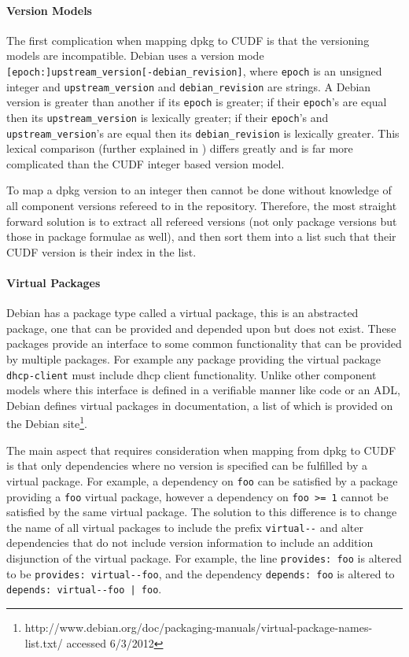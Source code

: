 \paragraph{Version Models}
The first complication when mapping dpkg to CUDF is that the versioning models are incompatible.
Debian uses a version mode \verb+[epoch:]upstream_version[-debian_revision]+,
where \verb+epoch+ is an unsigned integer and \verb+upstream_version+ and \verb+debian_revision+ are strings.
A Debian version is greater than another if its \verb+epoch+ is greater; 
if their \verb+epoch+'s are equal then its \verb+upstream_version+ is lexically greater; 
if their \verb+epoch+'s and \verb+upstream_version+'s are equal then its \verb+debian_revision+ is lexically greater.
This lexical comparison (further explained in \citep{Barth2005}) differs greatly and is far more complicated than the CUDF integer based version model.

To map a dpkg version to an integer then cannot be done without knowledge of all component versions refereed to in the repository.
Therefore, the most straight forward solution is to extract all refereed versions (not only package versions but those in package formulae as well),
and then sort them into a list such that their CUDF version is their index in the list.

\paragraph{Virtual Packages}
Debian has a package type called a virtual package, this is an abstracted package, one that can be provided and depended upon but does not exist.
These packages provide an interface to some common functionality that can be provided by multiple packages.
For example any package providing the virtual package \verb+dhcp-client+ must include dhcp client functionality. 
Unlike other component models where this interface is defined in a verifiable manner like code or an ADL,
Debian defines virtual packages in documentation, a list of which is provided on the Debian site\footnote{http://www.debian.org/doc/packaging-manuals/virtual-package-names-list.txt/ accessed 6/3/2012}.

The main aspect that requires consideration when mapping from dpkg to CUDF is that only dependencies where no version is specified can be fulfilled by a virtual package.
For example, a dependency on \verb+foo+ can be satisfied by a package providing a \verb+foo+ virtual package, 
however a dependency on \verb+foo >= 1+ cannot be satisfied by the same virtual package. 
The solution to this difference is to change the name of all virtual packages to include the prefix \verb+virtual--+ and 
alter dependencies that do not include version information to include an addition disjunction of the virtual package.
For example, the line \verb+provides: foo+ is altered to be \verb+provides: virtual--foo+, 
and the dependency \verb+depends: foo+ is altered to \verb+depends: virtual--foo | foo+.

